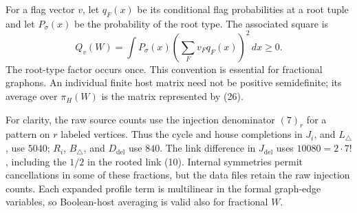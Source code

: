 For a flag vector \(v\), let \(q_F(x)\) be its conditional flag
probabilities at a root tuple and let \(P_\sigma(x)\) be the probability
of the root type. The associated square is
\begin{equation}
 Q_v(W)=\int P_\sigma(x)\left(\sum_Fv_Fq_F(x)\right)^2\,dx\ge0.\tag{26}
\end{equation}
The root-type factor occurs once. This convention is essential for
fractional graphons. An individual finite host matrix need not be positive
semidefinite; its average over \(\pi_H(W)\) is the matrix represented by
(26).

For clarity, the raw source counts use the injection denominator \((7)_r\)
for a pattern on \(r\) labeled vertices. Thus the cycle and house
completions in \(J_i\), and \(L_\triangle\), use \(5040\);
\(R_i\), \(B_\triangle\), and \(D_{\mathrm{del}}\) use \(840\).
The link difference in \(J_{\mathrm{del}}\) uses
\(10080=2\cdot7!\), including the \(1/2\) in the rooted link (10).
Internal symmetries permit cancellations in some of these fractions, but
the data files retain the raw injection counts. Each expanded profile term
is multilinear in the formal graph-edge variables, so Boolean-host
averaging is valid also for fractional \(W\).

